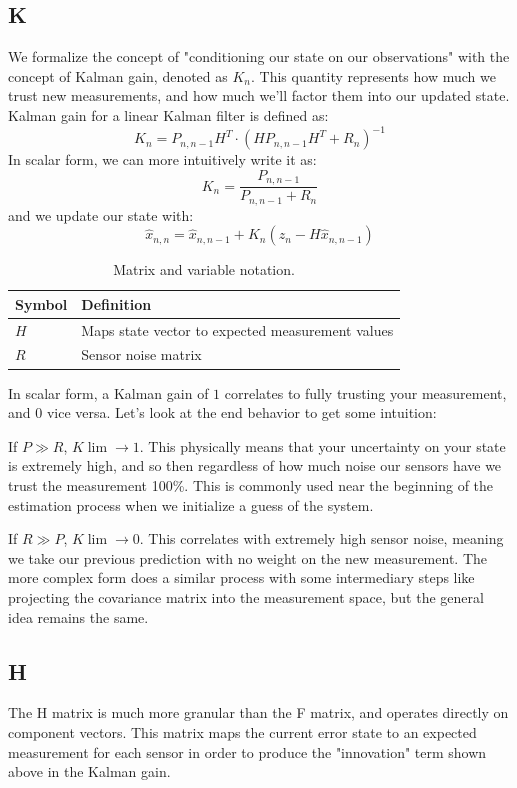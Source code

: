\documentclass{article}
\begin{document}
\subsection{K}
We formalize the concept of "conditioning our state on our observations" with the concept of Kalman gain, denoted as $K_n$. This quantity represents how much we trust new measurements, and how much we'll factor them into our updated state. Kalman gain for a linear Kalman filter is defined as:
\[
K_n = P_{n,n-1}H^T \cdot (H P_{n,n-1}H^T + R_n)^{-1}
\]
In scalar form, we can more intuitively write it as:
\[
K_n = \dfrac{P_{n,n-1}}{P_{n,n-1}+R_n}
\]
and we update our state with:
\[
\widehat{x}_{n,n} = \widehat{x}_{n,n-1} + K_n(z_n - H\widehat{x}_{n,n-1})
\]

\begin{table}[htbp !h]
\centering
\caption{Matrix and variable notation.}
\label{tab:matrices}
\begin{tabularx}{\columnwidth}{l X}
\toprule
\textbf{Symbol} & \textbf{Definition} \\
\midrule
$H$  & Maps state vector to expected measurement values\\
$R$  & Sensor noise matrix \\
\bottomrule
\end{tabularx}
\end{table}
In scalar form, a Kalman gain of $1$ correlates to fully trusting your measurement, and $0$ vice versa. Let's look at the end behavior to get some intuition:

If $P \gg R$, $K \lim\to 1$. This physically means that your uncertainty on your state is extremely high, and so then regardless of how much noise our sensors have we trust the measurement 100\%. This is commonly used near the beginning of the estimation process when we initialize a guess of the system.

If $R \gg P$, $K \lim \to 0$. This correlates with extremely high sensor noise, meaning we take our previous prediction with no weight on the new measurement.
The more complex form does a similar process with some intermediary steps like projecting the covariance matrix into the measurement space, but the general idea remains the same.

\subsection{H}
The H matrix is much more granular than the F matrix, and operates directly on component vectors. This matrix maps the current error state to an expected measurement for each sensor in order to produce the "innovation" term shown above in the Kalman gain.
\end{document}
